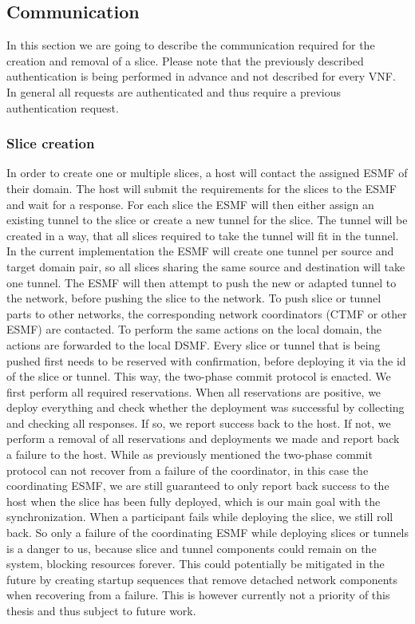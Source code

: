 \subsection{Communication}
\label{impl_communication}
In this section we are going to describe the communication required for the creation and removal of a slice. Please note that the previously described authentication is being performed in advance and not described for every VNF. In general all requests are authenticated and thus require a previous authentication request.

\subsubsection{Slice creation}
In order to create one or multiple slices, a host will contact the assigned ESMF of their domain. The host will submit the requirements for the slices to the ESMF and wait for a response. For each slice the ESMF will then either assign an existing tunnel to the slice or create a new tunnel for the slice. The tunnel will be created in a way, that all slices required to take the tunnel will fit in the tunnel. In the current implementation the ESMF will create one tunnel per source and target domain pair, so all slices sharing the same source and destination will take one tunnel. The ESMF will then attempt to push the new or adapted tunnel to the network, before pushing the slice to the network. To push slice or tunnel parts to other networks, the corresponding network coordinators (CTMF or other ESMF) are contacted. To perform the same actions on the local domain, the actions are forwarded to the local DSMF. Every slice or tunnel that is being pushed first needs to be reserved with confirmation, before deploying it via the id of the slice or tunnel. This way, the two-phase commit protocol is enacted. We first perform all required reservations. When all reservations are positive, we deploy everything and check whether the deployment was successful by collecting and checking all responses. If so, we report success back to the host. If not, we perform a removal of all reservations and deployments we made and report back a failure to the host. While as previously mentioned the two-phase commit protocol can not recover from a failure of the coordinator, in this case the coordinating ESMF, we are still guaranteed to only report back success to the host when the slice has been fully deployed, which is our main goal with the synchronization. When a participant fails while deploying the slice, we still roll back. So only a failure of the coordinating ESMF while deploying slices or tunnels is a danger to us, because slice and tunnel components could remain on the system, blocking resources forever. This could potentially be mitigated in the future by creating startup sequences that remove detached network components when recovering from a failure. This is however currently not a priority of this thesis and thus subject to future work.

